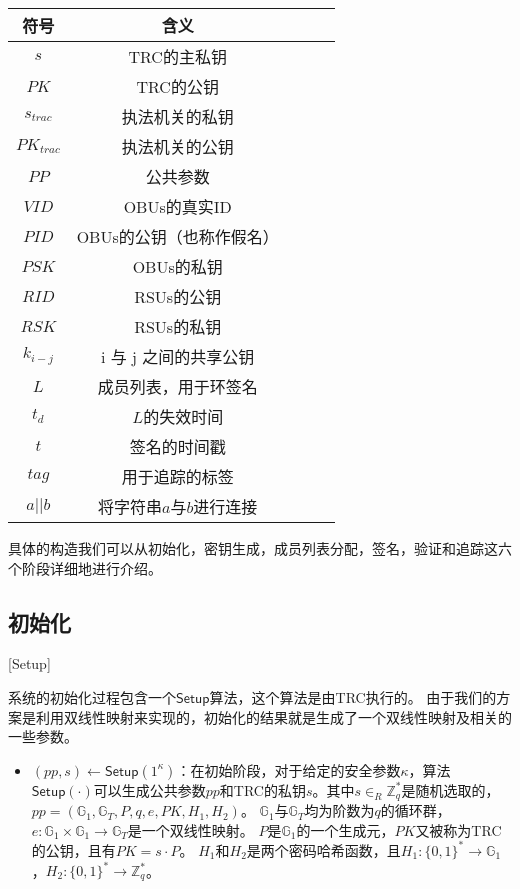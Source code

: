 \begin{table}[htbp]
\vspace{0.5em}\centering\wuhao
\begin{tabular}{ccccc}
\toprule[1.5pt]
 符号 & 含义 \\
\midrule[1pt]
 $s$ & TRC的主私钥 \\
 $PK$ & TRC的公钥\\
 $s_{trac}$ & 执法机关的私钥\\
 $PK_{trac}$ & 执法机关的公钥\\
 $PP$ & 公共参数\\
 $VID$ & OBUs的真实ID\\ 
 $PID$ & OBUs的公钥（也称作假名）\\
 $PSK$ & OBUs的私钥\\
 $RID$ & RSUs的公钥\\
 $RSK$ & RSUs的私钥\\
 $k_{i-j}$ & i 与 j 之间的共享公钥\\
 $L$ & 成员列表，用于环签名\\
 $t_d$ & $L$的失效时间\\
 $t$ & 签名的时间戳\\
 $tag$ & 用于追踪的标签\\
 $a||b$ & 将字符串$a$与$b$进行连接\\
\bottomrule[1.5pt]
\end{tabular}
\end{table}

具体的构造我们可以从初始化，密钥生成，成员列表分配，签名，验证和追踪这六个阶段详细地进行介绍。

\subsection{初始化}[Setup]

系统的初始化过程包含一个$\mathsf{Setup}$算法，这个算法是由TRC执行的。
由于我们的方案是利用双线性映射来实现的，初始化的结果就是生成了一个双线性映射及相关的一些参数。
\begin{itemize}
  \item $(pp,s)\leftarrow\mathsf{Setup}(1^\kappa)$：在初始阶段，对于给定的安全参数$\kappa$，算法$\mathsf{Setup}(\cdot)$可以生成公共参数$pp$和TRC的私钥$s$。其中$s\in_R\mathbb{Z}^*_q$是随机选取的，$pp=(\mathbb{G}_1,\mathbb{G}_T,P,q,e,PK,H_1,H_2)$。
  $\mathbb{G}_1$与$\mathbb{G}_T$均为阶数为$q$的循环群，$e:\mathbb{G}_1\times\mathbb{G}_1\rightarrow\mathbb{G}_T$是一个双线性映射。
$P$是$\mathbb{G}_1$的一个生成元，$PK$又被称为TRC的公钥，且有$PK=s\cdot P$。
$H_1$和$H_2$是两个密码哈希函数，且$H_1:\{0,1\}^*\rightarrow\mathbb{G}_1$，$H_2:\{0,1\}^*\rightarrow\mathbb{Z}_q^*$。
\end{itemize}

